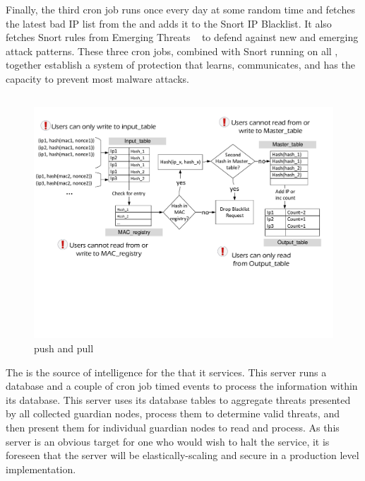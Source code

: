 Finally, the third cron job runs once every day at some random time and fetches the latest bad IP list from the \servname and adds it to the Snort IP Blacklist. It also fetches Snort rules from Emerging Threats ~\cite{emerging} to defend against new and emerging attack patterns. These three cron jobs, combined with Snort running on all \nodenames, together establish a system of protection that learns, communicates, and has the capacity to prevent most malware attacks.

\subsection{\servname}
\label{sec:design:server}

\begin{figure}
    \centering
    \includegraphics[width=0.95\linewidth]{figs/blacklist.pdf}
    \caption{\servname push and pull }
    \label{fig:blacklistserver}
\end{figure}

The \servname is the source of intelligence for the \nodenames that it services. This server runs a database and a couple of cron job timed events to process the information within its database. This server uses its database tables to aggregate threats presented by all collected guardian nodes, process them to determine valid threats, and then present them for individual guardian nodes to read and process. As this server is an obvious target for one who would wish to halt the \sysname service, it is foreseen that the server will be elastically-scaling and secure in a production level implementation. 

